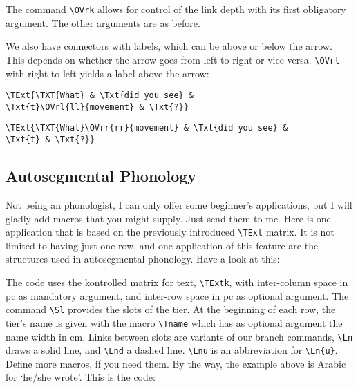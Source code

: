 \documentclass[12pt,a4paper]{article}
\begin{document}
The command \verb|\OVrk| allows for control of the link depth with its first
obligatory argument. The other arguments are as before.

We also have connectors with labels, which can be above or below the arrow. This
depends on whether the arrow goes from left to right or vice versa. \verb|\OVrl|
with right to left yields a label above the arrow:

\begin{minipage}[t]{5cm}
\end{minipage}
\begin{minipage}[t]{9cm}
\begin{verbatim}
\TExt{\TXT{What} & \Txt{did you see} &
\Txt{t}\OVrl{ll}{movement} & \Txt{?}}
\end{verbatim}
\end{minipage}

\begin{minipage}[t]{5cm}
\end{minipage}
\begin{minipage}[t]{9cm}
\begin{verbatim}
\TExt{\TXT{What}\OVrr{rr}{movement} & \Txt{did you see} &
\Txt{t} & \Txt{?}}
\end{verbatim}
\end{minipage}

\subsection{Autosegmental Phonology}

Not being an phonologist, I can only offer some beginner's applications, but I will
gladly add macros that you might supply. Just send them to me. Here is one application
that is based on the previously introduced \verb|\TExt| matrix. It is not limited to
having just one row, and one application of this feature are the structures used in
autosegmental phonology. Have a look at this:


The code uses the kontrolled matrix for text, \verb|\TExtk|, with inter-column
space in pc as mandatory argument, and inter-row space in pc as optional argument. The
command \verb|\Sl| provides the slots of the tier. At the beginning of each row, the
tier's name is given with the macro \verb|\Tname| which has as optional argument the
name width in cm. Links between slots are variants of our branch commands, \verb|\Ln|
draws a solid line, and \verb|\Lnd| a dashed line. \verb|\Lnu| is an abbreviation for
\verb|\Ln{u}|. Define more macros, if you need them. By the way, the example above is
Arabic for `he/she wrote'. This is the code:\newpage
\end{document}
